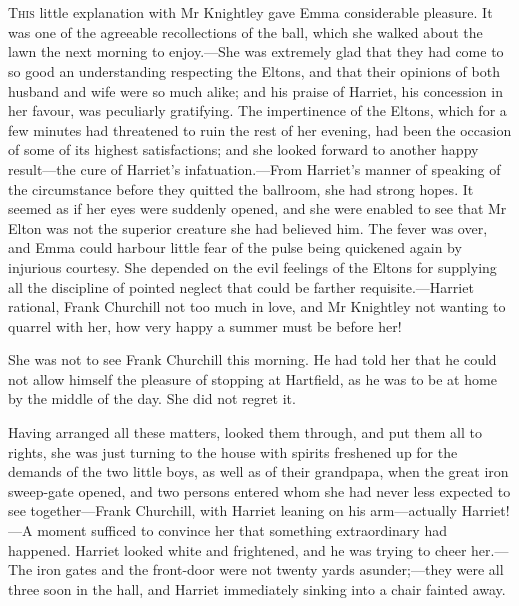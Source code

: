 \chapter[Chapter \thechapter]{}
\lettrine[lines=4,lraise=0.3]{T}{his} little explanation with Mr Knightley gave Emma considerable pleasure. It was one of the agreeable recollections of the ball, which she walked about the lawn the next morning to enjoy.—She was extremely glad that they had come to so good an understanding respecting the Eltons, and that their opinions of both husband and wife were so much alike; and his praise of Harriet, his concession in her favour, was peculiarly gratifying. The impertinence of the Eltons, which for a few minutes had threatened to ruin the rest of her evening, had been the occasion of some of its highest satisfactions; and she looked forward to another happy result—the cure of Harriet's infatuation.—From Harriet's manner of speaking of the circumstance before they quitted the ballroom, she had strong hopes. It seemed as if her eyes were suddenly opened, and she were enabled to see that Mr Elton was not the superior creature she had believed him. The fever was over, and Emma could harbour little fear of the pulse being quickened again by injurious courtesy. She depended on the evil feelings of the Eltons for supplying all the discipline of pointed neglect that could be farther requisite.—Harriet rational, Frank Churchill not too much in love, and Mr Knightley not wanting to quarrel with her, how very happy a summer must be before her!

She was not to see Frank Churchill this morning. He had told her that he could not allow himself the pleasure of stopping at Hartfield, as he was to be at home by the middle of the day. She did not regret it.

Having arranged all these matters, looked them through, and put them all to rights, she was just turning to the house with spirits freshened up for the demands of the two little boys, as well as of their grandpapa, when the great iron sweep-gate opened, and two persons entered whom she had never less expected to see together—Frank Churchill, with Harriet leaning on his arm—actually Harriet!—A moment sufficed to convince her that something extraordinary had happened. Harriet looked white and frightened, and he was trying to cheer her.—The iron gates and the front-door were not twenty yards asunder;—they were all three soon in the hall, and Harriet immediately sinking into a chair fainted away.

